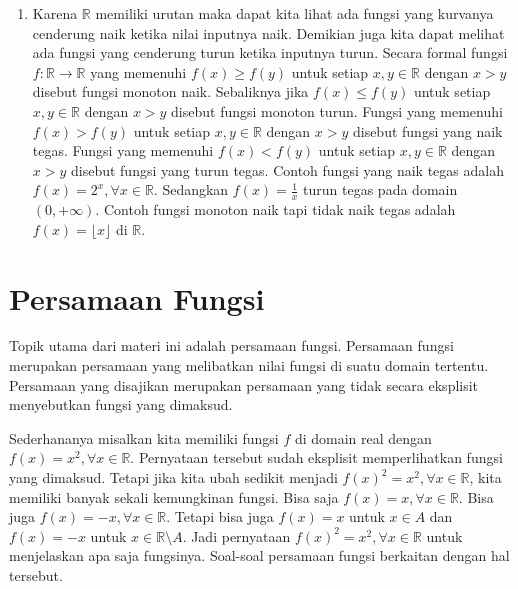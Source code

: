 \documentclass{article}
\begin{document}
\begin{enumerate}
\item Karena $\mathbb{R}$ memiliki urutan maka dapat kita lihat ada fungsi yang kurvanya cenderung naik ketika nilai inputnya naik. Demikian juga kita dapat melihat ada fungsi yang cenderung turun ketika inputnya turun. Secara formal fungsi $f : \mathbb{R} \rightarrow \mathbb{R}$ yang memenuhi $f(x) \ge f(y)$ untuk setiap $x,y \in \mathbb{R}$ dengan $x > y$ disebut fungsi monoton naik. Sebaliknya jika $f(x) \le f(y)$ untuk setiap $x,y \in \mathbb{R}$ dengan $x > y$ disebut fungsi monoton turun. Fungsi yang memenuhi $f(x) > f(y)$ untuk setiap $x,y \in \mathbb{R}$ dengan $x > y$ disebut fungsi yang naik tegas. Fungsi yang memenuhi $f(x) < f(y)$ untuk setiap $x,y \in \mathbb{R}$ dengan $x > y$ disebut fungsi yang turun tegas. Contoh fungsi yang naik tegas adalah $f(x) = 2^x, \forall x \in \mathbb{R}$. Sedangkan $f(x) = \frac{1}{x}$ turun tegas pada domain $(0,+\infty)$. Contoh fungsi monoton naik tapi tidak naik tegas adalah $f(x) = \lfloor x \rfloor$ di $\mathbb{R}$.
\end{enumerate}

\section{Persamaan Fungsi}
Topik utama dari materi ini adalah persamaan fungsi. Persamaan fungsi merupakan persamaan yang melibatkan nilai fungsi di suatu domain tertentu. Persamaan yang disajikan merupakan persamaan yang tidak secara eksplisit menyebutkan fungsi yang dimaksud.



Sederhananya misalkan kita memiliki fungsi $f$ di domain real dengan $f(x) = x^2, \forall x \in \mathbb{R}$. Pernyataan tersebut sudah eksplisit memperlihatkan fungsi yang dimaksud. Tetapi jika kita ubah sedikit menjadi $f(x)^2 = x^2, \forall x \in \mathbb{R}$, kita memiliki banyak sekali kemungkinan fungsi. Bisa saja $f(x) = x, \forall x \in \mathbb{R}$. Bisa juga $f(x) = -x, \forall x \in \mathbb{R}$. Tetapi bisa juga $f(x) = x$ untuk $x \in A$ dan $f(x) = -x$ untuk $x \in \mathbb{R} \setminus A$. Jadi pernyataan $f(x)^2 = x^2, \forall x \in \mathbb{R}$ untuk menjelaskan apa saja fungsinya. Soal-soal persamaan fungsi berkaitan dengan hal tersebut.
\end{document}
